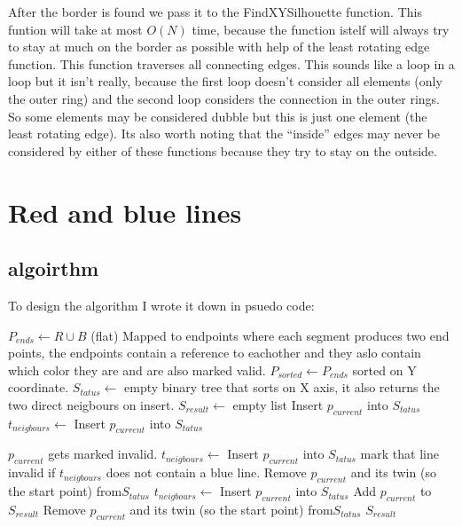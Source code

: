 \documentclass{article}
\begin{document}
After the border is found we pass it to the FindXYSilhouette function.
This funtion will take at most $O(N)$ time, because the function
istelf will always try to stay at much on the border as possible with help
of the least rotating edge function. This function traverses all connecting
edges. This sounds like a loop in a loop but it isn't really, because the
first loop doesn't consider all elements (only the outer ring) and the second
loop considers the connection in the outer rings. So some elements may be
considered dubble but this is just one element (the least rotating edge).
Its also worth noting that the ``inside'' edges may never be considered by
either of these functions because they try to stay on the outside.
\section{Red and blue lines}
\subsection{algoirthm}
To design the algorithm I wrote it down in psuedo code:
\begin{algorithmic}[1]
	\State
	$P_{ends} \gets R \cup B$ (flat) Mapped to endpoints where each segment
	produces two end points, the endpoints contain a reference to eachother
	and they aslo contain which color they are and are also marked
	valid.
	\State
	$P_{sorted} \gets P_{ends}$ sorted on Y coordinate.
	\State
	$S_{tatus} \gets $ empty binary tree that sorts on X axis, it also
	returns the two direct neigbours on insert.
	\State
	$S_{result} \gets $ empty list
			Insert $p_{current}$ into $S_{tatus}$
		\State
			\State
			$t_{neigbours} \gets $ Insert $p_{current}$ into $S_{tatus}$

				\State
				$p_{current}$ gets marked invalid.
			\EndIf
		\State
			\State
			$t_{neigbours} \gets $ Insert $p_{current}$ into
			$S_{tatus}$
				\State
				mark that line invalid if $t_{neigbours}$ does
				not contain a blue line.
			\EndIf
			\State
			Remove $p_{current}$ and its twin (so the start point) from$S_{tatus}$
		\State
			\State
			$t_{neigbours} \gets $ Insert $p_{current}$ into
			$S_{tatus}$
				Add $p_{current}$ to $S_{result}$
			\EndIf
			\State
			Remove $p_{current}$ and its twin (so the start point) from$S_{tatus}$
		\EndIf
	\EndFor
	\State
	\Return $S_{result}$
\end{algorithmic}
\end{document}
